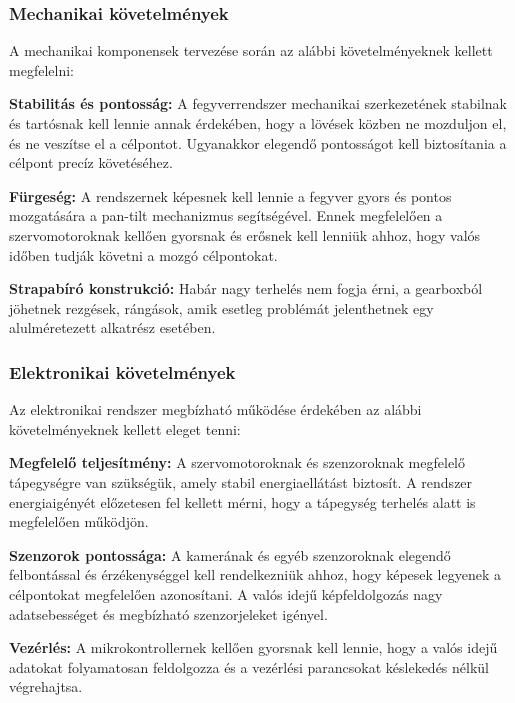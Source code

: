 \subsubsection*{Mechanikai követelmények} 

A mechanikai komponensek tervezése során az alábbi követelményeknek kellett megfelelni:
\begin{list}{}{}
	\item \textbf{Stabilitás és pontosság:}  A fegyverrendszer mechanikai szerkezetének stabilnak és tartósnak kell lennie annak érdekében, hogy a lövések közben ne mozduljon el, és ne veszítse el a célpontot. Ugyanakkor elegendő pontosságot kell biztosítania a célpont precíz követéséhez.
	\item \textbf{Fürgeség:} A rendszernek képesnek kell lennie a fegyver gyors és pontos mozgatására a pan-tilt mechanizmus segítségével. Ennek megfelelően a szervomotoroknak kellően gyorsnak és erősnek kell lenniük ahhoz, hogy valós időben tudják követni a mozgó célpontokat.
	\item \textbf{Strapabíró konstrukció:} Habár nagy terhelés nem fogja érni, a gearboxból jöhetnek rezgések, rángások, amik esetleg problémát jelenthetnek egy alulméretezett alkatrész esetében.
\end{list}

\subsubsection*{Elektronikai követelmények}

Az elektronikai rendszer megbízható működése érdekében az alábbi követelményeknek kellett eleget tenni:

\begin{list}{}{}
	\item \textbf{Megfelelő teljesítmény:}  A szervomotoroknak és szenzoroknak megfelelő tápegységre van szükségük, amely stabil energiaellátást biztosít. A rendszer energiaigényét előzetesen fel kellett mérni, hogy a tápegység terhelés alatt is megfelelően működjön.
	\item \textbf{Szenzorok pontossága:} A kamerának és egyéb szenzoroknak elegendő felbontással és érzékenységgel kell rendelkezniük ahhoz, hogy képesek legyenek a célpontokat megfelelően azonosítani. A valós idejű képfeldolgozás nagy adatsebességet és megbízható szenzorjeleket igényel.
	\item \textbf{Vezérlés:} A mikrokontrollernek kellően gyorsnak kell lennie, hogy a valós idejű adatokat folyamatosan feldolgozza és a vezérlési parancsokat késlekedés nélkül végrehajtsa.
\end{list}
\pagebreak

